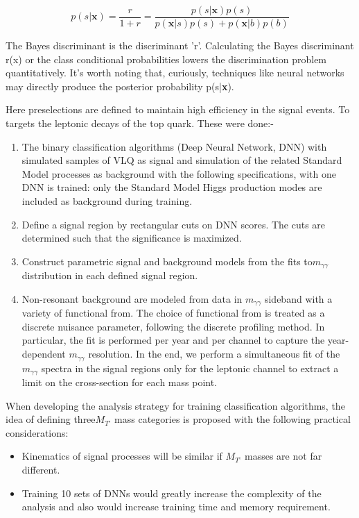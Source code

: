 \begin{equation}
    p(s|\textbf{x}) = \frac{r}{1+r} = \frac{ p(s|\textbf{x}) p(s)}{p(\textbf{x}|s)p(s) +  p(\textbf{x}|b)p(b)}
\end{equation}

The Bayes discriminant is the discriminant 'r'. Calculating the Bayes discriminant r(x) or the class conditional probabilities lowers the discrimination problem quantitatively. It's worth noting that, curiously, techniques like neural networks may directly produce the posterior probability p(s|\textbf{x}).



Here preselections are defined to maintain high efficiency in the signal events. To targets the leptonic decays of the top quark. These were done:-
\begin{enumerate}
    \item The binary classification algorithms (Deep Neural Network, DNN) with simulated samples of VLQ as signal and simulation of the related Standard Model processes as background with the following specifications, with one DNN is trained: only the Standard Model Higgs production modes are included as background during training.

\item Define a signal region by rectangular cuts on DNN scores. The cuts are determined such that the significance is maximized.

\item Construct parametric signal and background models from the fits to$m_{\gamma\gamma}$ distribution in each defined signal region. 
\item Non-resonant background are modeled from data in $m_{\gamma\gamma}$  sideband with a variety of functional from. The choice of functional from is treated as a discrete nuisance parameter, following the discrete profiling method. In particular, the fit is performed per year and per channel to capture the year-dependent $m_{\gamma\gamma}$ resolution. In the end, we perform a simultaneous fit of the $m_{\gamma\gamma}$  spectra in the signal regions only for the leptonic channel to extract a limit on the cross-section for each mass point.
\end{enumerate}


When developing the analysis strategy for training classification algorithms, the idea of defining three$M_{T’}$ mass categories is proposed with the following practical considerations:
\begin{itemize}
    \item Kinematics of signal processes will be similar if $M_{T’}$ masses are not far different.
    \item Training 10 sets of DNNs would greatly increase the complexity of the analysis and also would increase training time and memory requirement.
\end{itemize}

